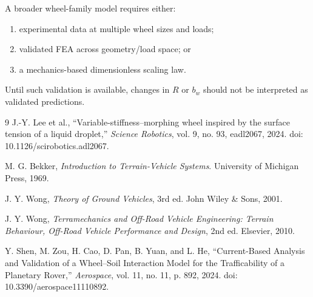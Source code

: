 \documentclass[11pt]{article}
\begin{document}
A broader wheel-family model requires either:
\begin{enumerate}[label=(\arabic*)]
\item experimental data at multiple wheel sizes and loads;
\item validated FEA across geometry/load space; or
\item a mechanics-based dimensionless scaling law.
\end{enumerate}

Until such validation is available, changes in $R$ or $b_w$ should not be interpreted as validated predictions.

\begin{thebibliography}{9}
J.-Y. Lee et al., ``Variable-stiffness--morphing wheel inspired by the surface tension of a liquid droplet,'' \emph{Science Robotics}, vol. 9, no. 93, eadl2067, 2024. doi: 10.1126/scirobotics.adl2067.

M. G. Bekker, \emph{Introduction to Terrain-Vehicle Systems}. University of Michigan Press, 1969.

J. Y. Wong, \emph{Theory of Ground Vehicles}, 3rd ed. John Wiley \& Sons, 2001.

J. Y. Wong, \emph{Terramechanics and Off-Road Vehicle Engineering: Terrain Behaviour, Off-Road Vehicle Performance and Design}, 2nd ed. Elsevier, 2010.

Y. Shen, M. Zou, H. Cao, D. Pan, B. Yuan, and L. He, ``Current-Based Analysis and Validation of a Wheel--Soil Interaction Model for the Trafficability of a Planetary Rover,'' \emph{Aerospace}, vol. 11, no. 11, p. 892, 2024. doi: 10.3390/aerospace11110892.
\end{thebibliography}
\end{document}

